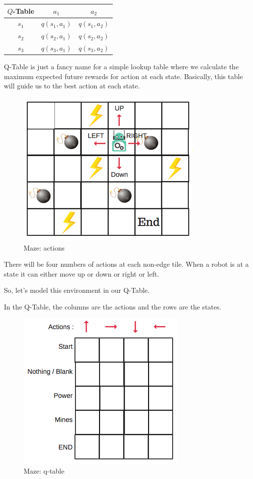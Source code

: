 \begin{tabular}{|c||c|c|}
\hline
$Q$-Table	& $a_1$	& $a_2$ \\
\hline
$s_1$	& $q(s_1,a_1)$	& $q(s_1,a_2)$ \\
\hline
$s_2$	& $q(s_2,a_1)$	& $q(s_2,a_2)$ \\
\hline
$s_3$	& $q(s_3,a_1)$	& $q(s_3,a_2)$ \\
\hline
\end{tabular}\;

\vspace

Q-Table is just a fancy name for a simple lookup table where we calculate the 
maximum expected future rewards for action at each state. Basically, this table 
will guide us to the best action at each state.

\begin{figure}[!htb]
\centering
\includegraphics[scale=0.618]{pix/q_learning/q_robot_maze_actions.png}
\caption{Maze: actions}
\end{figure}
There will be four numbers of actions at each non-edge tile. When a robot is at a 
state it can either move up or down or right or left.

So, let's model this environment in our Q-Table.

In the Q-Table, the columns are the actions and the rows are the states.

\begin{figure}[!htb]
\centering
\includegraphics[scale=0.618]{pix/q_learning/q_robot_maze_table.png}
\caption{Maze: q-table}
\end{figure}

